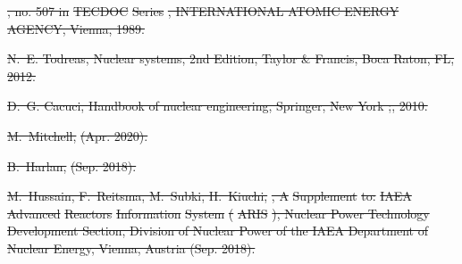 \documentclass[preprint]{elsarticle}
\providecommand{\DIFdeltex}[1]{{\protect\color{red}\sout{#1}}}                      %
\providecommand{\DIFdel}[1]{\texorpdfstring{\DIFdeltex{#1}}{}} %
\begin{document}
\DIFdel{, no. 507 in }%
\DIFdel{TECDOC}%
\DIFdel{Series}%
\DIFdel{, INTERNATIONAL ATOMIC ENERGY AGENCY,
  Vienna, 1989.
}%

\DIFdel{N.~E. Todreas, Nuclear systems, 2nd Edition, Taylor \& Francis, Boca Raton, FL,
  2012.
}%

\DIFdel{D.~G. Cacuci, Handbook of nuclear engineering, Springer, New York ;, 2010.
}%

\DIFdel{M.~Mitchell,
  }%
\DIFdel{(Apr. 2020).
}%

\DIFdel{B.~Harlan,
  }%
\DIFdel{(Sep. 2018).
}%

\DIFdel{M.~Hussain, F.~Reitsma, M.~Subki, H.~Kiuchi,
  }%
\DIFdel{, A }%
\DIFdel{Supplement}%
\DIFdel{to: }%
\DIFdel{IAEA}%
\DIFdel{Advanced}%
\DIFdel{Reactors}%
\DIFdel{Information}%
\DIFdel{System}%
\DIFdel{(}%
\DIFdel{ARIS}%
\DIFdel{), Nuclear Power Technology Development
  Section, Division of Nuclear Power of the IAEA Department of Nuclear Energy,
  Vienna, Austria (Sep. 2018).
}%
\end{document}
